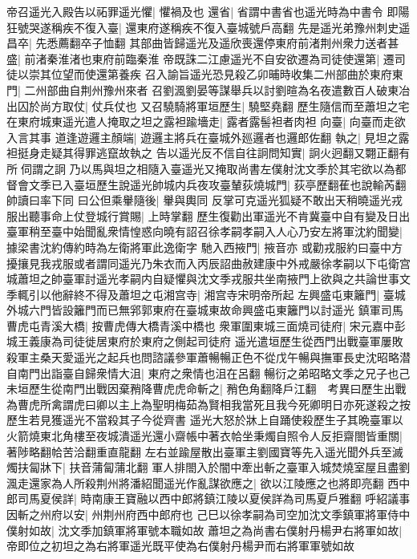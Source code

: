 帝召遥光入殿告以祏罪遥光懼|{
	懼禍及也}
還省|{
	省謂中書省也遥光時為中書令}
即陽狂號哭遂稱疾不復入臺|{
	還東府遂稱疾不復入臺城號戶高翻}
先是遥光弟豫州刺史遥昌卒|{
	先悉薦翻卒子恤翻}
其部曲皆歸遥光及遥欣喪還停東府前渚荆州衆力送者甚盛|{
	前渚秦淮渚也東府前臨秦淮}
帝既誅二江慮遥光不自安欲遷為司徒使還第|{
	遷司徒以崇其位望而使還第養疾}
召入諭旨遥光恐見殺乙卯晡時收集二州部曲於東府東門|{
	二州部曲自荆州豫州來者}
召劉渢劉晏等謀舉兵以討劉暄為名夜遣數百人破東冶出囚於尚方取仗|{
	仗兵仗也}
又召驍騎將軍垣歷生|{
	驍堅堯翻}
歷生隨信而至蕭坦之宅在東府城東遥光遣人掩取之坦之露袒踰墻走|{
	露者露髻袒者肉袒}
向臺|{
	向臺而走欲入言其事}
道逢遊邏主顏端|{
	遊邏主將兵在臺城外廵邏者也邏郎佐翻}
執之|{
	見坦之露袒挺身走疑其得罪逃竄故執之}
告以遥光反不信自往詗問知實|{
	詗火迥翻又翾正翻有所伺謂之詗}
乃以馬與坦之相隨入臺遥光又掩取尚書左僕射沈文季於其宅欲以為都督會文季已入臺垣歷生說遥光帥城内兵夜攻臺輦荻燒城門|{
	荻亭歷翻萑也說輸芮翻帥讀曰率下同}
曰公但乘轝隨後|{
	轝與輿同}
反掌可克遥光狐疑不敢出天稍曉遥光戎服出聽事命上仗登城行賞賜|{
	上時掌翻}
歷生復勸出軍遥光不肯冀臺中自有變及日出臺軍稍至臺中始聞亂衆情惶惑向曉有詔召徐孝嗣孝嗣入人心乃安左將軍沈約聞變|{
	據梁書沈約傳約時為左衛將軍此逸衛字}
馳入西掖門|{
	掖音亦}
或勸戎服約曰臺中方擾攘見我戎服或者謂同遥光乃朱衣而入丙辰詔曲赦建康中外戒嚴徐孝嗣以下屯衛宫城蕭坦之帥臺軍討遥光孝嗣内自疑懼與沈文季戎服共坐南掖門上欲與之共論世事文季輒引以他辭終不得及蕭坦之屯湘宫寺|{
	湘宫寺宋明帝所起}
左興盛屯東籬門|{
	臺城外城六門皆設籬門而已無郛郭東府在臺城東故命興盛屯東籬門以討遥光}
鎮軍司馬曹虎屯青溪大橋|{
	按曹虎傳大橋青溪中橋也}
衆軍圍東城三面燒司徒府|{
	宋元嘉中彭城王義康為司徒徙居東府於東府之側起司徒府}
遥光遣垣歷生從西門出戰臺軍屢敗殺軍主桑天愛遥光之起兵也問諮議參軍蕭暢暢正色不從戊午暢與撫軍長史沈昭略潜自南門出詣臺自歸衆情大沮|{
	東府之衆情也沮在呂翻}
暢衍之弟昭略文季之兄子也己未垣歷生從南門出戰因棄矟降曹虎虎命斬之|{
	矟色角翻降戶江翻　考異曰歷生出戰為曹虎所禽謂虎曰卿以主上為聖明梅茹為賢相我當死且我今死卿明日亦死遂殺之按歷生若見獲遥光不當殺其子今從齊書}
遥光大怒於牀上自踊使殺歷生子其晩臺軍以火箭燒東北角樓至夜城潰遥光還小齋帳中著衣帢坐秉燭自照令人反拒齋閤皆重關|{
	著陟略翻帢苦洽翻重直龍翻}
左右並踰屋散出臺軍主劉國寶等先入遥光聞外兵至滅燭扶匐牀下|{
	扶音蒲匐蒲北翻}
軍人排閤入於闇中牽出斬之臺軍入城焚燒室屋且盡劉渢走還家為人所殺荆州將潘紹聞遥光作亂謀欲應之|{
	欲以江陵應之也將即亮翻}
西中郎司馬夏侯詳|{
	時南康王寶融以西中郎將鎮江陵以夏侯詳為司馬夏戶雅翻}
呼紹議事因斬之州府以安|{
	州荆州府西中郎府也}
己巳以徐孝嗣為司空加沈文季鎮軍將軍侍中僕射如故|{
	沈文季加鎮軍將軍號本職如故}
蕭坦之為尚書右僕射丹楊尹右將軍如故|{
	帝即位之初坦之為右將軍遥光既平使為右僕射丹楊尹而右將軍軍號如故}
